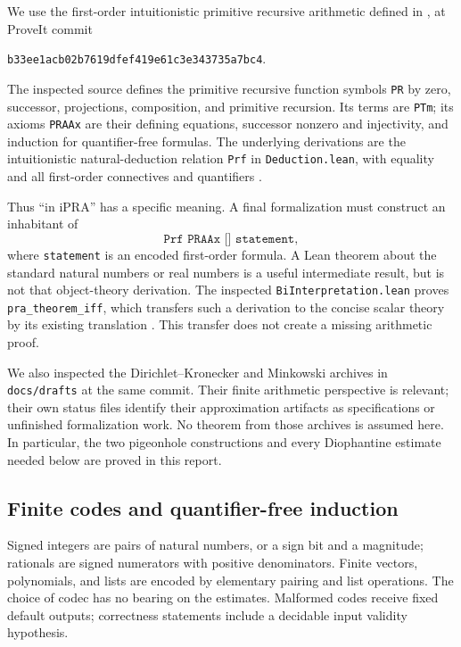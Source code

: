 We use the first-order intuitionistic primitive recursive arithmetic defined
in , at ProveIt commit
\begin{center}
\texttt{b33ee1acb02b7619dfef419e61c3e343735a7bc4}.
\end{center}
The inspected source defines the primitive recursive function symbols
\texttt{PR} by zero, successor, projections, composition, and primitive
recursion.  Its terms are \texttt{PTm}; its axioms \texttt{PRAAx} are their
defining equations, successor nonzero and injectivity, and induction for
quantifier-free formulas.  The underlying derivations are the intuitionistic
natural-deduction relation \texttt{Prf} in \texttt{Deduction.lean}, with
equality and all first-order connectives and quantifiers
\cite{ProveItPR,ProveItDeduction}.

Thus ``in iPRA'' has a specific meaning.  A final formalization must construct
an inhabitant of
\[
 \texttt{Prf PRAAx [] statement},
\]
where \texttt{statement} is an encoded first-order formula.  A Lean theorem
about the standard natural numbers or real numbers is a useful intermediate
result, but is not that object-theory derivation.  The inspected
\texttt{BiInterpretation.lean} proves \texttt{pra\_theorem\_iff}, which transfers
such a derivation to the concise scalar theory by its existing translation
\cite{ProveItBi}.  This transfer does not create a missing arithmetic proof.

We also inspected the Dirichlet--Kronecker and Minkowski archives in
\texttt{docs/drafts} at the same commit.  Their finite arithmetic perspective
is relevant; their own status files identify their approximation artifacts as
specifications or unfinished formalization work.  No theorem from those
archives is assumed here.  In particular, the two pigeonhole constructions
and every Diophantine estimate needed below are proved in this report.

\subsection{Finite codes and quantifier-free induction}

Signed integers are pairs of natural numbers, or a sign bit and a magnitude;
rationals are signed numerators with positive denominators.  Finite vectors,
polynomials, and lists are encoded by elementary pairing and list operations.
The choice of codec has no bearing on the estimates.  Malformed codes receive
fixed default outputs; correctness statements include a decidable input
validity hypothesis.

